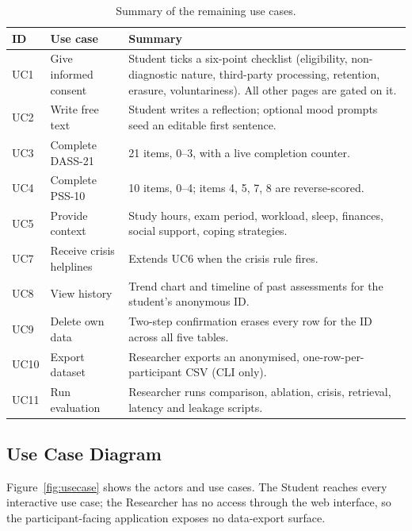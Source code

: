 \begin{table}[ht]
	\centering
	\caption{Summary of the remaining use cases.}
	\label{tab:uc-other}
	\begin{tabularx}{\textwidth}{llL}
		\toprule
		ID   & Use case                 & Summary \\ \midrule
		UC1  & Give informed consent    & Student ticks a six-point checklist (eligibility, non-diagnostic nature, third-party processing, retention, erasure, voluntariness). All other pages are gated on it. \\
		UC2  & Write free text          & Student writes a reflection; optional mood prompts seed an editable first sentence. \\
		UC3  & Complete DASS-21         & 21 items, 0--3, with a live completion counter. \\
		UC4  & Complete PSS-10          & 10 items, 0--4; items 4, 5, 7, 8 are reverse-scored. \\
		UC5  & Provide context          & Study hours, exam period, workload, sleep, finances, social support, coping strategies. \\
		UC7  & Receive crisis helplines & Extends UC6 when the crisis rule fires. \\
		UC8  & View history             & Trend chart and timeline of past assessments for the student's anonymous ID. \\
		UC9  & Delete own data          & Two-step confirmation erases every row for the ID across all five tables. \\
		UC10 & Export dataset           & Researcher exports an anonymised, one-row-per-participant CSV (CLI only). \\
		UC11 & Run evaluation           & Researcher runs comparison, ablation, crisis, retrieval, latency and leakage scripts. \\ \bottomrule
	\end{tabularx}
\end{table}

\subsection{Use Case Diagram}
Figure~\ref{fig:usecase} shows the actors and use cases. The Student reaches every interactive use case; the Researcher has no access through the web interface, so the participant-facing application exposes no data-export surface.


